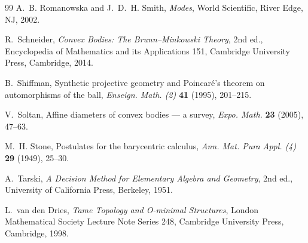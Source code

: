\documentclass[11pt]{amsart}
\theoremstyle{definition}
\begin{document}
\begin{thebibliography}{99}
A.~B. Romanowska and J.~D.~H. Smith,
\emph{Modes},
World Scientific, River Edge, NJ, 2002.

R.~Schneider,
\emph{Convex Bodies: The Brunn--Minkowski Theory}, 2nd ed.,
Encyclopedia of Mathematics and its Applications 151,
Cambridge University Press, Cambridge, 2014.

B.~Shiffman,
Synthetic projective geometry and Poincar\'e's theorem on automorphisms of
the ball,
\emph{Enseign. Math. (2)} \textbf{41} (1995), 201--215.

V.~Soltan,
Affine diameters of convex bodies --- a survey,
\emph{Expo. Math.} \textbf{23} (2005), 47--63.

M.~H. Stone,
Postulates for the barycentric calculus,
\emph{Ann. Mat. Pura Appl. (4)} \textbf{29} (1949), 25--30.

A.~Tarski,
\emph{A Decision Method for Elementary Algebra and Geometry},
2nd ed., University of California Press, Berkeley, 1951.

L.~van den Dries,
\emph{Tame Topology and O-minimal Structures},
London Mathematical Society Lecture Note Series 248,
Cambridge University Press, Cambridge, 1998.

\end{thebibliography}
\end{document}
